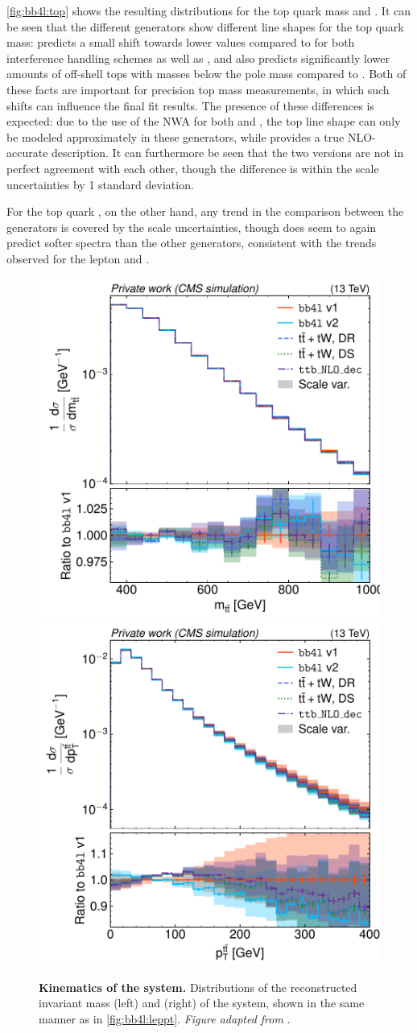 \cref{fig:bb4l:top} shows the resulting distributions for the top quark mass and \pt. It can be seen that the different generators show different line shapes for the top quark mass: \bbfourl predicts a small shift towards lower values compared to \tttWsum for both interference handling schemes as well as \ttb, and also predicts significantly lower amounts of off-shell tops with masses below the pole mass compared to \tttWsum. Both of these facts are important for precision top mass measurements, in which such shifts can influence the final fit results. The presence of these differences is expected: due to the use of the NWA for both \tttWsum and \ttb, the top line shape can only be modeled approximately in these generators, while \bbfourl provides a true NLO-accurate description. It can furthermore be seen that the two \bbfourl versions are not in perfect agreement with each other, though the difference is within the scale uncertainties by 1 standard deviation.

For the top quark \pt, on the other hand, any trend in the comparison between the generators is covered by the scale uncertainties, though \bbfourl does seem to again predict softer \pt spectra than the other generators, consistent with the trends observed for the lepton \pt and \mll.

\begin{figure}[tp]
    \centering
    \includegraphics[width=0.49 \textwidth]{figures/bb4l/generators/MC_TTBAR_DILEP_SPINDENSITY_ttbar_mass.pdf}
    \hfill
    \includegraphics[width=0.49 \textwidth]{figures/bb4l/generators/MC_TTBAR_DILEP_SPINDENSITY_ttbar_pt.pdf}
    \caption{\textbf{Kinematics of the \ttbar system.} Distributions of the reconstructed invariant mass (left) and \pt (right) of the \ttbar system, shown in the same manner as in \cref{fig:bb4l:leppt}. \textit{Figure adapted from }.}
    \label{fig:bb4l:ttbar}
\end{figure}

